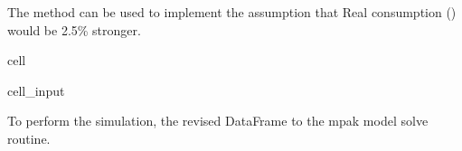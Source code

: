 \documentclass[letterpaper,10pt,english]{jupyterBook}
\begin{document}
\sphinxAtStartPar
The  method can be used to implement the assumption that Real consumption () would be 2.5\% stronger.

\begin{sphinxuseclass}{cell}\begin{sphinxVerbatimInput}

\begin{sphinxuseclass}{cell_input}
\begin{sphinxVerbatim}[commandchars=\\\{\}]
\end{sphinxVerbatim}

\end{sphinxuseclass}\end{sphinxVerbatimInput}

\end{sphinxuseclass}
\sphinxAtStartPar
To perform the simulation, the revised  DataFrame to the mpak model solve routine.

\sphinxAtStartPar
{}
\end{document}
